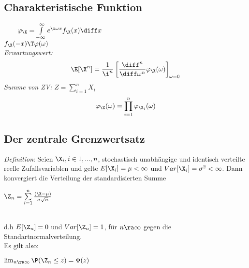 \documentclass[german,color,6pt]{latex4ei/latex4ei_sheet}
\begin{document}
\begin{sectionbox}
	\subsection{Charakteristische Funktion} %
	\label{sub:charakteristische_funktion}
	 $\qquad \varphi_{\X} = \int\limits_{-\infty}^\infty e^{\i\omega x} f_{\X}(x) \diff x$\\
	$f_{\X}(-x) \T \varphi(\omega)$ \\

	\emph{Erwartungswert:}
	\begin{eqnarray*}
		\E[\X^n] = \frac{1}{\i^n} \left[\frac{\diff^n}{\diff \omega^n} \varphi_{\X}(\omega)\right]_{\omega = 0}
	\end{eqnarray*}
	\emph{Summe von ZV:} $Z=\sum_{i=1}^{n}X_i$
	\begin{eqnarray*}
		\varphi_{\Z} (\omega) = \prod_{i=1}^{n} \varphi_{\X_i} (\omega)
	\end{eqnarray*}
\end{sectionbox}

\begin{sectionbox}
	\subsection{Der zentrale Grenzwertsatz}
	\emph{Definition}: Seien $\X_i, i \in {1,...,n}$, stochastisch unabhängige und identisch
	verteilte reelle Zufallsvariablen und gelte $E[\X_i] = \mu < \infty$ und $Var[\X_i] = \sigma^2 < \infty$.
	Dann konvergiert die Verteilung der standardisierten Summe\\
	\centerline{$\Z_n= \sum\limits_{i=1}^{n}\frac{(\X-\mu)}{\sigma\sqrt{n}}$} \\
	d.h $E[\Z_n] = 0$ und $Var[\Z_n] = 1$, für $n \ra \infty$ gegen die Standartnormalverteilung. \\
	Es gilt also: \\
	\centerline{$\lim_{n \ra \infty} \P({\Z_n \le z}) = \Phi (z)$}
\end{sectionbox}
\end{document}
